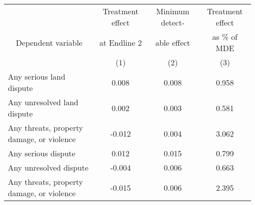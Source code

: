 
\begin{tabular}{lccc}
\toprule
\multicolumn{1}{c}{} & \multicolumn{1}{c}{Treatment effect} & \multicolumn{1}{c}{Minimum detect-} & \multicolumn{1}{c}{Treatment effect} \\
\cmidrule(l{2pt}r{2pt}){2-2} \cmidrule(l{2pt}r{2pt}){3-3} \cmidrule(l{2pt}r{2pt}){4-4}
\multicolumn{1}{c}{Dependent variable} & \multicolumn{1}{c}{at Endline 2} & \multicolumn{1}{c}{able effect} & \multicolumn{1}{c}{as \% of MDE} \\
\cmidrule(l{2pt}r{2pt}){1-1} \cmidrule(l{2pt}r{2pt}){2-2} \cmidrule(l{2pt}r{2pt}){3-3} \cmidrule(l{2pt}r{2pt}){4-4}
 & (1) & (2) & (3)\\
\midrule
Any serious land dispute & 0.008 & 0.008 & 0.958\\
Any unresolved land dispute & 0.002 & 0.003 & 0.581\\
Any threats, property damage, or violence & -0.012 & 0.004 & 3.062\\
Any serious dispute & 0.012 & 0.015 & 0.799\\
Any unresolved dispute & -0.004 & 0.006 & 0.663\\
\phantom{} Any threats, property damage, or violence & -0.015 & 0.006 & 2.395\\
\bottomrule
\end{tabular}